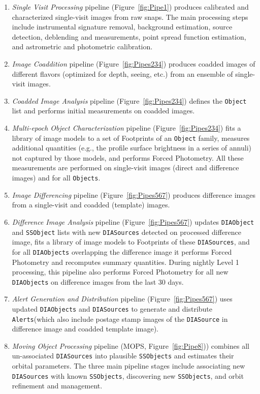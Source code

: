 \documentclass[12pt]{article}
\newcommand{\code}[1]{\texttt{#1}}
\newcommand{\Alerts}{\code{Alerts}\xspace}
\newcommand{\DIASource}{\code{DIASource}\xspace}
\newcommand{\DIASources}{\code{DIASources}\xspace}
\newcommand{\DIAObject}{\code{DIAObject}\xspace}
\newcommand{\DIAObjects}{\code{DIAObjects}\xspace}
\newcommand{\Object}{\code{Object}\xspace}
\newcommand{\Objects}{\code{Objects}\xspace}
\newcommand{\SSObject}{\code{SSObject}\xspace}
\newcommand{\SSObjects}{\code{SSObjects}\xspace}
\newcommand{\req}[1]{\marginpar{\tiny #1}}
\begin{document}
\begin{enumerate}
\item {\it Single Visit Processing} pipeline (Figure~\ref{fig:Pipe1}) produces calibrated and
characterized single-visit images from raw snaps. The main processing steps include instrumental
signature removal, background estimation, source detection, deblending and measurements,
point spread function estimation, and astrometric and photometric calibration.
\item {\it Image Coaddition} pipeline (Figure~\ref{fig:Pipes234}) produces coadded images
of different flavors (optimized for depth, seeing, etc.) from an ensemble of single-visit images.
\item {\it Coadded Image Analysis} pipeline (Figure~\ref{fig:Pipes234}) defines the \Object list
and performs initial measurements on coadded images.
\item {\it Multi-epoch Object Characterization} pipeline (Figure~\ref{fig:Pipes234}) fits a library
of image models to a set of Footprints of an \Object family, measures additional quantities (e.g.,
the profile surface brightness in a series of annuli) not captured by those models, and performs
Forced Photometry. All these measurements are performed on single-visit images (direct and
difference images) and for all \Objects.
\item {\it Image Differencing} pipeline (Figure~\ref{fig:Pipes567}) produces difference images
from a single-visit and coadded (template) images.
\item {\it Difference Image Analysis} pipeline (Figure~\ref{fig:Pipes567}) updates
\DIAObject and \SSObject lists with new \DIASources detected on processed difference image,
fits a library of image models to Footprints of these \DIASources, and for all \DIAObjects
overlapping the difference image it performs Forced Photometry and recomputes summary quantities.
During nightly Level 1 processing, this pipeline also performs Forced Photometry
for all new \DIAObjects on difference images from the last 30 days\req{precoveryWindow}.
\item {\it Alert Generation and Distribution} pipeline (Figure~\ref{fig:Pipes567}) uses updated
\DIAObjects and \DIASources to generate and distribute \Alerts (which also include postage stamp
images of the \DIASource in difference image and coadded template image).
\item {\it Moving Object Processing} pipeline (MOPS, Figure~\ref{fig:Pipe8})) combines all
un-associated \DIASources into plausible \SSObjects and estimates their orbital parameters.
The three main pipeline stages include associating new \DIASources with known \SSObjects,
discovering new \SSObjects, and orbit refinement and management.
\end{enumerate}
\end{document}

